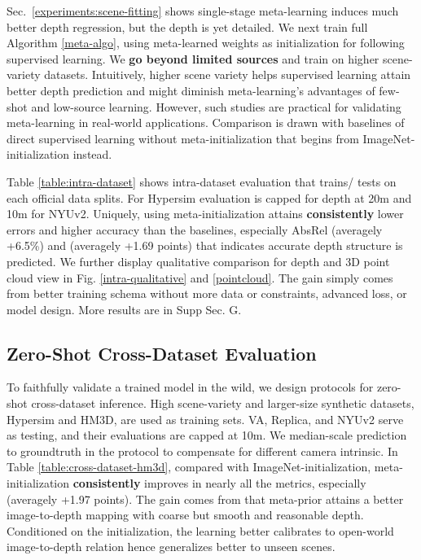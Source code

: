 Sec.~\ref{experiments:scene-fitting} shows single-stage meta-learning induces much better depth regression, but the depth is yet detailed. We next train full Algorithm \ref{meta-algo}, using meta-learned weights as initialization for following supervised learning. We \textbf{go beyond limited sources} and train on higher scene-variety datasets. 
Intuitively, higher scene variety helps supervised learning attain better depth prediction and might diminish meta-learning's advantages of few-shot and low-source learning.
However, such studies are practical for validating meta-learning in real-world applications.
Comparison is drawn with baselines of direct supervised learning without meta-initialization that begins from ImageNet-initialization instead. 




Table \ref{table:intra-dataset} shows intra-dataset evaluation that trains/ tests on each official data splits.
For Hypersim evaluation is capped for depth at 20m and 10m for NYUv2. 
Uniquely, using meta-initialization attains \textbf{consistently} lower errors and higher accuracy than the baselines, especially AbsRel (averagely +6.5\%) and  (averagely +1.69 points) that indicates accurate depth structure is predicted. We further display qualitative comparison for depth and 3D point cloud view in Fig. \ref{intra-qualitative} and \ref{pointcloud}. 
The gain simply comes from better training schema without more data or constraints, advanced loss, or model design. More results are in Supp Sec. G.


\subsection{Zero-Shot Cross-Dataset Evaluation} 
\label{experiments:cross-dataset}

To faithfully validate a trained model in the wild, we design protocols for zero-shot cross-dataset inference. High scene-variety and larger-size synthetic datasets, Hypersim and HM3D, are used as training sets. VA, Replica, and NYUv2 serve as testing, and their evaluations are capped at 10m. We median-scale prediction to groundtruth in the protocol to compensate for different camera intrinsic. In Table \ref{table:cross-dataset-hm3d}, compared with ImageNet-initialization, meta-initialization \textbf{consistently} improves in nearly all the metrics, especially  (averagely +1.97 points). 
The gain comes from that meta-prior attains a better image-to-depth mapping with coarse but smooth and reasonable depth. Conditioned on the initialization, the learning better calibrates to open-world image-to-depth relation hence generalizes better to unseen scenes. 





